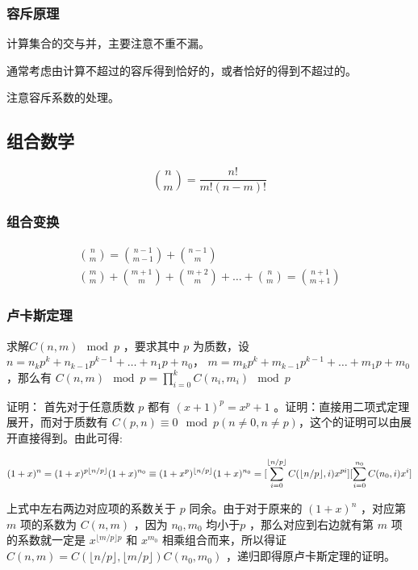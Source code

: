 \documentclass[UTF-8]{ctexart}
\begin{document}
			\subsubsection{容斥原理}
			计算集合的交与并，主要注意不重不漏。
			
			通常考虑由计算不超过的容斥得到恰好的，或者恰好的得到不超过的。
			
			注意容斥系数的处理。
		\subsection{组合数学}
			$${n\choose m}=\frac{n!}{m!(n-m)!}$$
			\subsubsection{组合变换}
			\begin{align}
			{n \choose m}={n-1 \choose m-1}+{n-1 \choose m} \nonumber\\
			{m \choose m}+{m+1 \choose m}+{m+2 \choose m}+\dots+{n \choose m}={n+1 \choose m+1}\nonumber
			\end{align}
			\subsubsection{卢卡斯定理}
			求解$C(n,m) \mod{p}$ ，要求其中 $p$ 为质数，设$n=n _ k p ^ k+n _ {k-1} p ^ {k-1}+ \dots+n _ 1 p+n _ 0$， $m=m _ k p ^ k + m _ {k-1} p ^ { k-1} + \dots+m _ 1 p+m _ 0 $ ，那么有 $C(n,m) \mod{p} = \prod _ {i=0} ^ k C(n _ i,m _ i) \mod{p}$
			
			证明：	首先对于任意质数 $p$ 都有 $(x+1) ^ p=x ^ p +1$ 。证明：直接用二项式定理展开，而对于质数有 $C(p,n) \equiv 0 \mod{p} (n \neq0,n \neq p)$，这个的证明可以由展开直接得到。由此可得:  
			
			$$(1+x) ^ n =(1+x) ^ {p \lfloor n/p \rfloor}(1+x) ^ {n _ 0} \\\\ \equiv (1+x ^ p) ^ {\lfloor n/p \rfloor }(1+x) ^ {n _ 0} \\\\ =[\sum _ {i=0} ^ {\lfloor n/p \rfloor} C(\lfloor n/p \rfloor ,i) x ^ {pi}][\sum _ {i=0} ^ {n _ 0} C(n _ 0,i)x ^ i]$$
			
			上式中左右两边对应项的系数关于 $p$ 同余。由于对于原来的 $(1+x) ^ n$ ，对应第 $m$ 项的系数为 $C(n,m)$ ，因为 $n _ 0,m _ 0$ 均小于$p$ ，那么对应到右边就有第 $m$ 项的系数就一定是 $x ^ {\lfloor m/p \rfloor p}$ 和 $x ^ {m _ 0}$ 相乘组合而来，所以得证 $C(n,m)=C(\lfloor n/p \rfloor,\lfloor m/p \rfloor)C(n _ 0,m _ 0)$ ，递归即得原卢卡斯定理的证明。
\end{document}
